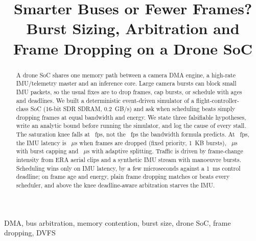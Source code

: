 \documentclass[conference]{IEEEtran}
\begin{document}
\title{Smarter Buses or Fewer Frames? Burst Sizing, Arbitration and Frame Dropping on a Drone SoC}
\author{\and {}\and {}}
\maketitle

\begin{abstract}
A drone SoC shares one memory path between a camera DMA engine, a high-rate IMU/telemetry master and an inference core. Large camera bursts can block small IMU packets, so the usual fixes are to drop frames, cap bursts, or schedule with ages and deadlines. We built a deterministic event-driven simulator of a flight-controller-class SoC (16-bit SDR SDRAM, 0.2~GB/s) and ask when scheduling beats simply dropping frames at equal bandwidth and energy. We state three falsifiable hypotheses, write an analytic bound before running the simulator, and log the cause of every stall. The saturation knee falls at \kneeFps{}~fps, not the \kneePredFps{}~fps the bandwidth formula predicts. At \policyFps{}~fps, the IMU \pone{} latency is \imuDropOneTwenty{}~$\mu$s when frames are dropped (fixed priority, 1~KB bursts), \imuCapOneTwenty{}~$\mu$s with burst capping and \imuAdaptOneTwenty{}~$\mu$s with adaptive splitting. Traffic is driven by frame-change intensity from \nClips{} ERA aerial clips and a synthetic IMU stream with manoeuvre bursts. Scheduling wins only on IMU latency, by a few microseconds against a 1~ms control deadline; on frame age and energy, plain frame dropping matches or beats every scheduler, and above the knee deadline-aware arbitration starves the IMU.
\end{abstract}
\begin{IEEEkeywords}
DMA, bus arbitration, memory contention, burst size, drone SoC, frame dropping, DVFS
\end{IEEEkeywords}
\end{document}
